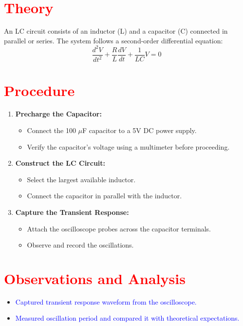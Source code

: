 \documentclass[a4paper,12pt]{article}
\begin{document}
\section{\textcolor{red}{Theory}}
\begin{tcolorbox}[colframe=purple!70!black,colback=magenta!10!white]
An LC circuit consists of an inductor (L) and a capacitor (C) connected in parallel or series. The system follows a second-order differential equation:
\begin{equation}
    \frac{d^2V}{dt^2} + \frac{R}{L} \frac{dV}{dt} + \frac{1}{LC} V = 0
\end{equation}
\end{tcolorbox}

\section{\textcolor{red}{Procedure}}
\begin{tcolorbox}[colfame=orange!70!black,colback=yellow!20!white]
\begin{enumerate}
    \item \textbf{Precharge the Capacitor:}
    \begin{itemize}
        \item Connect the 100 $\mu$F capacitor to a 5V DC power supply.
        \item Verify the capacitor’s voltage using a multimeter before proceeding.
    \end{itemize}
    \item \textbf{Construct the LC Circuit:}
    \begin{itemize}
        \item Select the largest available inductor.
        \item Connect the capacitor in parallel with the inductor.
    \end{itemize}
    \item \textbf{Capture the Transient Response:}
    \begin{itemize}
        \item Attach the oscilloscope probes across the capacitor terminals.
        \item Observe and record the oscillations.
    \end{itemize}
\end{enumerate}
\end{tcolorbox}

\section{\textcolor{red}{Observations and Analysis}}
\begin{tcolorbox}[colframe=teal!70!black,colback=cyan!10!white]
\begin{itemize}
    \item \textcolor{blue}{Captured transient response waveform from the oscilloscope.}
    \item \textcolor{blue}{Measured oscillation period and compared it with theoretical expectations.}
\end{itemize}
\end{tcolorbox}
\end{document}
